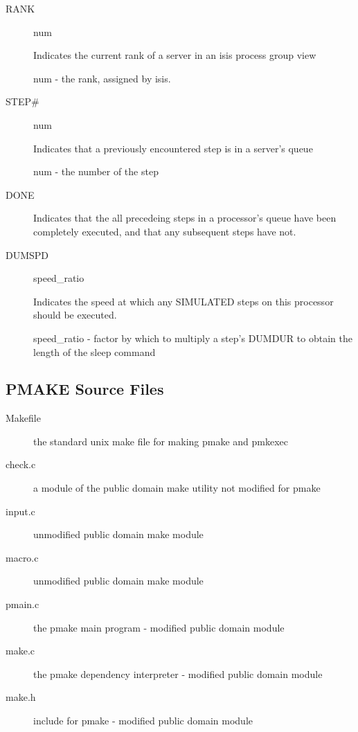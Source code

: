 \begin{itemize}
\begin{description}
\item[RANK]   num
       
Indicates the current rank of a server in an isis process group view

       num - the rank, assigned by isis.

\item[STEP#]  num
       
Indicates that a previously encountered step is in a server's queue

       num - the number of the step

\item[DONE]

       Indicates that the all precedeing steps in a processor's queue have been
       completely executed, and that any subsequent steps have not.

\item[DUMSPD] speed\_ratio
       
Indicates the speed at which any SIMULATED steps on this processor
       should be executed.

       speed\_ratio - factor by which to multiply a step's DUMDUR to obtain
                     the length of the sleep command

\end{description}
\subsection*{PMAKE Source Files}
\begin{description}
\item[Makefile] the standard unix make file for making pmake and pmkexec

\item[check.c] a module of the public domain make utility not modified for pmake

\item[input.c] unmodified public domain make module

\item[macro.c] unmodified public domain make module

\item[pmain.c] the pmake main program - modified public domain module

\item[make.c] the pmake dependency interpreter - modified public domain module

\item[make.h] include for pmake - modified public domain module


\end{description}
\end{itemize}
